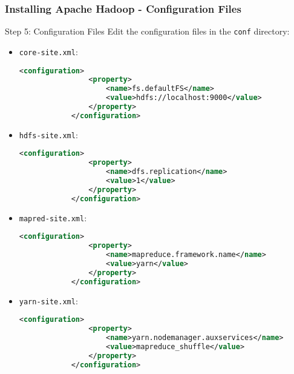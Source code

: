 \documentclass{beamer}
\begin{document}
\begin{frame}[fragile]
    \frametitle{Installing Apache Hadoop - Configuration Files}
    \begin{block}{Step 5: Configuration Files}
        Edit the configuration files in the \texttt{conf} directory:
        \begin{itemize}
            \item \texttt{core-site.xml}:
            \begin{lstlisting}[language=XML]
            <configuration>
                <property>
                    <name>fs.defaultFS</name>
                    <value>hdfs://localhost:9000</value>
                </property>
            </configuration>
            \end{lstlisting}

            \item \texttt{hdfs-site.xml}:
            \begin{lstlisting}[language=XML]
            <configuration>
                <property>
                    <name>dfs.replication</name>
                    <value>1</value>
                </property>
            </configuration>
            \end{lstlisting}

            \item \texttt{mapred-site.xml}:
            \begin{lstlisting}[language=XML]
            <configuration>
                <property>
                    <name>mapreduce.framework.name</name>
                    <value>yarn</value>
                </property>
            </configuration>
            \end{lstlisting}

            \item \texttt{yarn-site.xml}:
            \begin{lstlisting}[language=XML]
            <configuration>
                <property>
                    <name>yarn.nodemanager.auxservices</name>
                    <value>mapreduce_shuffle</value>
                </property>
            </configuration>
            \end{lstlisting}
        \end{itemize}
    \end{block}
\end{frame}
\end{document}
